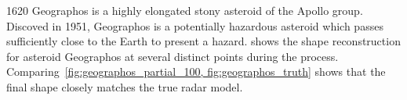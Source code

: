 \num{1620} Geographos is a highly elongated stony asteroid of the Apollo group.
Discoved in \num{1951}, Geographos is a potentially hazardous asteroid which passes sufficiently close to the Earth to present a hazard.
 shows the shape reconstruction for asteroid Geographos at several distinct points during the process.
Comparing~\cref{fig:geographos_partial_100, fig:geographos_truth} shows that the final shape closely matches the true radar model.
\begin{figure}[htbp]
    \centering
    ~


\end{figure}
